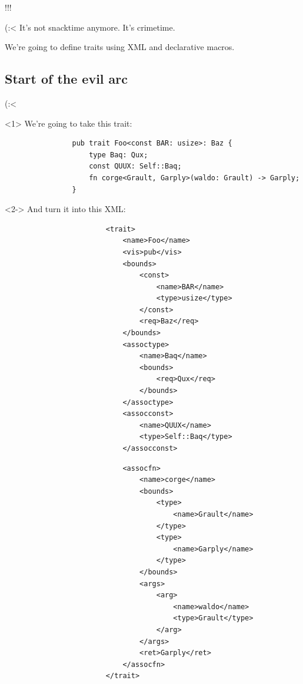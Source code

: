 \documentclass{beamer}
\begin{document}
	\begin{frame}{!!!}
		\centering
		
	\end{frame}

	\begin{frame}{(:<}
		It's not snacktime anymore. It's crimetime.

		We're going to define traits using XML and declarative macros.
	\end{frame}

	\subsection{Start of the evil arc}
	\begin{frame}[fragile]{(:<}
		\begin{onlyenv}<1>
			We're going to take this trait:

			\begin{verbatim}
				pub trait Foo<const BAR: usize>: Baz {
					type Baq: Qux;
					const QUUX: Self::Baq;
					fn corge<Grault, Garply>(waldo: Grault) -> Garply;
				}
			\end{verbatim}
		\end{onlyenv}

		\pause

		\begin{onlyenv}<2->
			And turn it into this XML:
			\begin{center}
				\begin{minipage}{0.45\linewidth}
					\begin{verbatim}
						<trait>
							<name>Foo</name>
							<vis>pub</vis>
							<bounds>
								<const>
									<name>BAR</name>
									<type>usize</type>
								</const>
								<req>Baz</req>
							</bounds>
							<assoctype>
								<name>Baq</name>
								<bounds>
									<req>Qux</req>
								</bounds>
							</assoctype>
							<assocconst>
								<name>QUUX</name>
								<type>Self::Baq</type>
							</assocconst>
					\end{verbatim}
				\end{minipage}
				\hfill
				\begin{minipage}{0.45\linewidth}
					\begin{verbatim}
							<assocfn>
								<name>corge</name>
								<bounds>
									<type>
										<name>Grault</name>
									</type>
									<type>
										<name>Garply</name>
									</type>
								</bounds>
								<args>
									<arg>
										<name>waldo</name>
										<type>Grault</type>
									</arg>
								</args>
								<ret>Garply</ret>
							</assocfn>
						</trait>
					\end{verbatim}
				\end{minipage}
			\end{center}


\end{onlyenv}
\end{frame}
\end{document}
